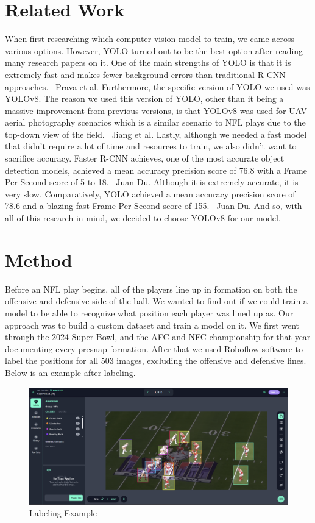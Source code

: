 \section{Related Work}

When first researching which computer vision model to train, we came across various options. However, YOLO turned out to be the best option after reading many research papers on it.
One of the main strengths of YOLO is that it is extremely fast and makes fewer background errors than traditional R-CNN approaches.~\cite{Alpher05} Prava et al. Furthermore, 
the specific version of YOLO we used was YOLOv8. The reason we used this version of YOLO, other than it being a massive improvement from previous versions, is that YOLOv8 was used for UAV aerial photography scenarios which is a similar scenario to NFL plays due to the top-down
view of the field.~\cite{Alpher02} Jiang et al. Lastly, although we needed a fast model that didn't require a lot of time and resources to train, we also didn't want to sacrifice accuracy. Faster R-CNN achieves, one of the most accurate object detection models, achieved a mean accuracy precision score of 76.8 with a Frame Per Second score of 5 to 18.~\cite{Du_2018} Juan Du. Although
it is extremely accurate, it is very slow. Comparatively, YOLO achieved a mean accuracy precision score of 78.6 and a blazing fast Frame Per Second score of 155.~\cite{Du_2018} Juan Du. And so, with all of this research in mind, we decided to choose YOLOv8 for our model.

\section{Method}

Before an NFL play begins, all of the players line up in formation on both the offensive and defensive side of the ball. We wanted to find out if we could train a model to be able to recognize what position each player was lined up as. Our approach was to build a custom dataset and train a model on it. We first went through the 2024 Super Bowl, and the AFC and NFC championship for that year documenting every presnap formation. After that we used Roboflow software to label the positions for all 503 images, excluding the offensive and defensive lines. Below is an example after labeling.~\cite{Roboflow}
\begin{figure}[t]
    \centering
    \includegraphics[width=\linewidth]{LabelingExample.png}
    \caption{Labeling Example}
    \label{fig:result1}
\end{figure}

